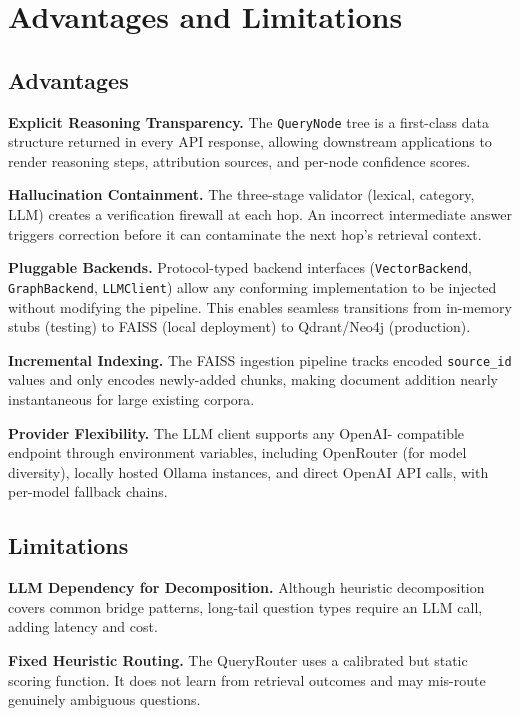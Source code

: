 \documentclass[conference]{IEEEtran}
\begin{document}
\section{Advantages and Limitations}
\label{sec:adv}

\subsection{Advantages}

\textbf{Explicit Reasoning Transparency.}  The \texttt{QueryNode}
tree is a first-class data structure returned in every API response,
allowing downstream applications to render reasoning steps,
attribution sources, and per-node confidence scores.

\textbf{Hallucination Containment.}  The three-stage validator
(lexical, category, LLM) creates a verification firewall at each hop.
An incorrect intermediate answer triggers correction before it can
contaminate the next hop's retrieval context.

\textbf{Pluggable Backends.}  Protocol-typed backend interfaces
(\texttt{VectorBackend}, \texttt{GraphBackend}, \texttt{LLMClient})
allow any conforming implementation to be injected without modifying
the pipeline.  This enables seamless transitions from in-memory stubs
(testing) to FAISS (local deployment) to Qdrant/Neo4j (production).

\textbf{Incremental Indexing.}  The FAISS ingestion pipeline tracks
encoded \texttt{source\_id} values and only encodes newly-added chunks,
making document addition nearly instantaneous for large existing corpora.

\textbf{Provider Flexibility.}  The LLM client supports any OpenAI-
compatible endpoint through environment variables, including OpenRouter
(for model diversity), locally hosted Ollama instances, and direct
OpenAI API calls, with per-model fallback chains.

\subsection{Limitations}

\textbf{LLM Dependency for Decomposition.}  Although heuristic
decomposition covers common bridge patterns, long-tail question types
require an LLM call, adding latency and cost.

\textbf{Fixed Heuristic Routing.}  The QueryRouter uses a calibrated
but static scoring function.  It does not learn from retrieval
outcomes and may mis-route genuinely ambiguous questions.
\end{document}
